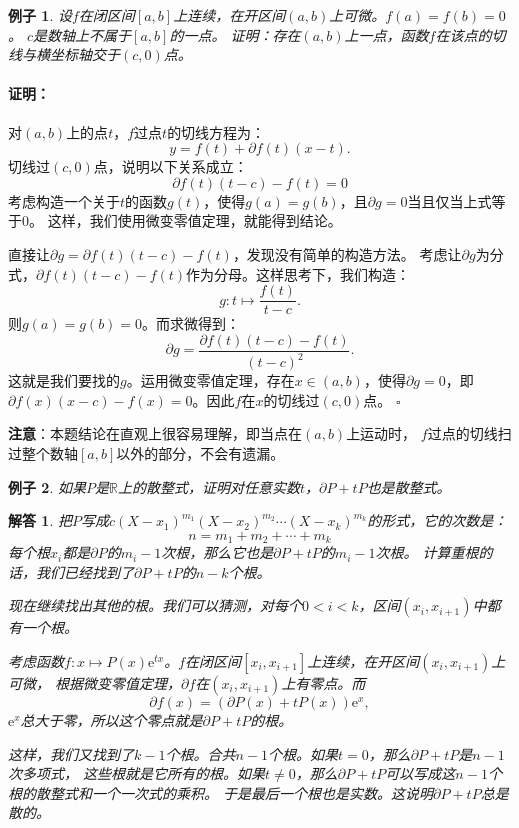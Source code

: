 \documentclass[12pt,UTF8]{ctexbook}
\newtheorem{ex}{例子}[section]
\newtheorem*{so}{解答}
\renewenvironment{proof}{\paragraph{\textbf{证明：}}}{\hfill$\square$}
\begin{document}
\begin{ex}\label{ex:3-2-4-1}
    设$f$在闭区间$[a, b]$上连续，在开区间$(a, b)$上可微。$f(a) = f(b) = 0$。
    $c$是数轴上不属于$[a, b]$的一点。
    证明：存在$(a, b)$上一点，函数$f$在该点的切线与横坐标轴交于$(c, 0)$点。
\end{ex}

\begin{proof}
    对$(a, b)$上的点$t$，$f$过点$t$的切线方程为：
    $$ y = f(t) + \partial f(t) (x - t).$$
    切线过$(c, 0)$点，说明以下关系成立：
    $$ \partial f(t) (t - c) - f(t) = 0$$
    考虑构造一个关于$t$的函数$g(t)$，使得$g(a) = g(b)$，且$\partial g = 0$当且仅当上式等于$0$。
    这样，我们使用微变零值定理，就能得到结论。

    直接让$\partial g = \partial f(t) (t - c) - f(t)$，发现没有简单的构造方法。
    考虑让$\partial g$为分式，$\partial f(t) (t - c) - f(t)$作为分母。这样思考下，我们构造：
    $$ g: t\mapsto \frac{f(t)}{t - c}.$$
    则$g(a) = g(b) = 0$。而求微得到：
    $$ \partial g = \frac{\partial f(t) (t - c) - f(t)}{(t - c)^2}.$$
    这就是我们要找的$g$。运用微变零值定理，存在$x\in(a, b)$，使得$\partial g = 0$，即
    $\partial f(x) (x - c) - f(x) = 0$。因此$f$在$x$的切线过$(c, 0)$点。
\end{proof}

\textbf{注意}：本题结论在直观上很容易理解，即当点在$(a, b)$上运动时，
$f$过点的切线扫过整个数轴$[a, b]$以外的部分，不会有遗漏。


\begin{ex}\label{ex:3-2-4-10}
    如果$P$是$\mathbb{R}$上的散整式，证明对任意实数$t$，$\partial P + tP$也是散整式。
\end{ex}

\begin{so}
    把$P$写成$c(X - x_1)^{m_1}(X - x_2)^{m_2}\cdots(X - x_k)^{m_k}$的形式，它的次数是：
    $$n = m_1 + m_2 + \cdots +m_k$$
    每个根$x_i$都是$\partial P$的$m_i - 1$次根，那么它也是$\partial P + tP$的$m_i - 1$次根。
    计算重根的话，我们已经找到了$\partial P + tP$的$n - k$个根。

    现在继续找出其他的根。我们可以猜测，对每个$0<i<k$，区间$(x_i, x_{i+1})$中都有一个根。

    考虑函数$f:x\mapsto P(x)\mathrm{e}^{tx}$。$f$在闭区间$[x_i, x_{i+1}]$上连续，在开区间$(x_i, x_{i+1})$上可微，
    根据微变零值定理，$\partial f$在$(x_i, x_{i+1})$上有零点。而 
    $$ \partial f (x) = (\partial P(x) + tP(x))\mathrm{e}^x,$$
    $\mathrm{e}^x$总大于零，所以这个零点就是$\partial P + tP$的根。

    这样，我们又找到了$k-1$个根。合共$n-1$个根。如果$t=0$，那么$\partial P + tP$是$n-1$次多项式，
    这些根就是它所有的根。如果$t\neq 0$，那么$\partial P + tP$可以写成这$n-1$个根的散整式和一个一次式的乘积。
    于是最后一个根也是实数。这说明$\partial P + tP$总是散的。

\end{so}
\end{document}
